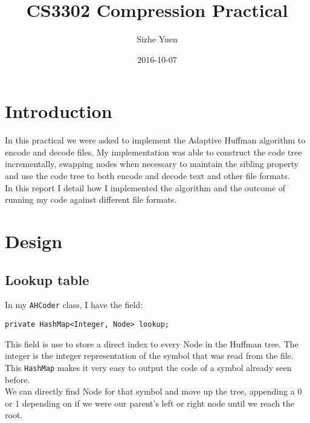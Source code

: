 \documentclass{article}
\title{CS3302 Compression Practical}
\date{2016-10-07}
\author{Sizhe Yuen}
\newcommand{\n}[0]{\\[\baselineskip]}
\begin{document}
\maketitle

\newpage
{}

\section{Introduction}
In this practical we were asked to implement the Adaptive Huffman algorithm to encode and decode files. My implementation was able to construct the code tree incrementally, swapping nodes when necessary to maintain the sibling property and use the code tree to both encode and decode text and other file formats. \n In this report I detail how I implemented the algorithm and the outcome of running my code against different file formats. 

\section{Design}
\subsection{Lookup table}
In my \texttt{AHCoder} class, I have the field: 
\begin{lstlisting}
private HashMap<Integer, Node> lookup;
\end{lstlisting}
This field is use to store a direct index to every Node in the Huffman tree. The integer is the integer representation of the symbol that was read from the file. This \texttt{HashMap} makes it very easy to output the code of a symbol already seen before. \n We can directly find Node for that symbol and move up the tree, appending a 0 or 1 depending on if we were our parent's left or right node until we reach the root. 
\end{document}
